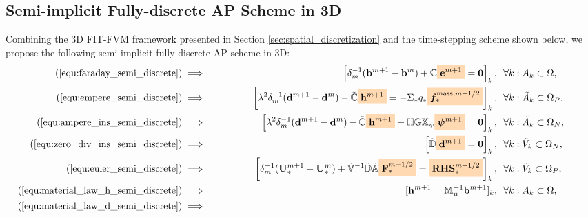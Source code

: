 \documentclass{article}
\newcommand{\mycolorbox}[2]{\colorbox{#1}{$\displaystyle#2$}}
\begin{document}
\subsection{Semi-implicit Fully-discrete AP Scheme in 3D} \label{sec:3d_ap_scheme}
Combining the 3D FIT-FVM framework presented in Section \ref{sec:spatial_discretization} and the time-stepping scheme shown below, we propose the following semi-implicit fully-discrete AP scheme in 3D:
\begin{subequations}
\begin{align}
    (\ref{equ:faraday_semi_discrete}) &\implies \;\;\;\;\;\;\;\;\;\;\;\;\;\; &
    \left[\delta_m^{-1} (\mathbf{b}^{m+1} - \mathbf{b}^{m}) + \mathbb{C}\mycolorbox{orange!30}{\mathbf{e}^{m+1}} = \mathbf{0} \right]_k,\ \ &\forall k:A_k \subset \Omega, \;\;\;\;\;\;\;\;\;\;\;\label{equ:maxwell_faraday_ap}\\
    (\ref{equ:empere_semi_discrete}) &\implies &
    \left[\lambda^2\delta_m^{-1}(\mathbf{d}^{m+1} - \mathbf{d}^m)- \Tilde{\mathbb{C}}\mycolorbox{orange!30}{\mathbf{h}^{m+1}} = - \Sigma_\ast q_\ast \mycolorbox{orange!30}{\bm{f}^{\text{mass},m+1/2}_{\ast}}\right]_k,\ \ &\forall k:\Tilde{A}_k\subset\Omega_P, \label{equ:maxwell_ampere_plasma_ap}\\
    (\ref{equ:ampere_ins_semi_discrete}) &\implies &
    \left[\lambda^2\delta_m^{-1}(\mathbf{d}^{m+1} - \mathbf{d}^m)- \Tilde{\mathbb{C}}\mycolorbox{orange!30}{\mathbf{h}^{m+1}} + \mathbb{H}\mathbb{GX}_\psi\mycolorbox{orange!30}{\bm{\psi}^{m+1}} = \mathbf{0} \right]_k,\ \ &\forall k:\Tilde{A}_k\subset\Omega_N, \label{equ:maxwell_ampere_nonconducting_ap}\\
    (\ref{equ:zero_div_ins_semi_discrete}) &\implies &
    \left[\Tilde{\mathbb{D}}\mycolorbox{orange!30}{\mathbf{d}^{m+1}} = \mathbf{0}\right]_k, \ \ &\forall k : \Tilde{V}_k \subset \Omega_N, \label{equ:gauss_nonconducting_ap} \\
    (\ref{equ:euler_semi_discrete}) &\implies &
    \left[\delta_m^{-1}(\mathbf{U}_{*}^{m+1} - \mathbf{U}_{*}^{m}) + \mathbb{\Tilde{V}}^{-1}\mathbb{\Tilde{D}}\mathbb{\Tilde{A}}\mycolorbox{orange!30}{\mathbf{F}_\ast^{m+1/2}} = \mycolorbox{orange!30}{\mathbf{RHS}_\ast^{m+1/2}} \right]_k,\ \ &\forall k : \Tilde{V}_k \subset \Omega_P, \label{equ:euler_ap}\\
    (\ref{equ:material_law_h_semi_discrete}) &\implies &
    [\mathbf{h}^{m+1} = \mathbb{M}_\mu^{-1}\mathbf{b}^{m+1}]_k, \ \ &\forall k:A_k \subset \Omega, \label{equ:material_law_h_ap}\\
    (\ref{equ:material_law_d_semi_discrete}) &\implies &

\end{align}
\end{subequations}
\end{document}
